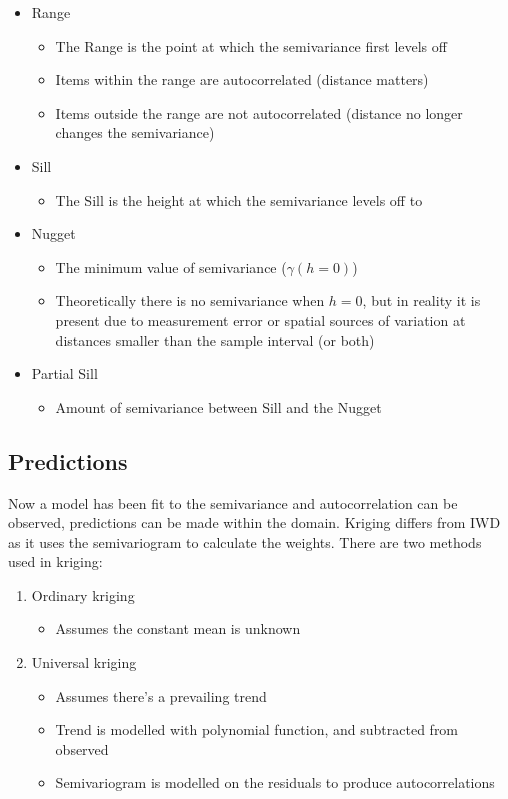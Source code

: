 \documentclass{article}
\begin{document}
\begin{itemize}
    \item Range
    \begin{itemize}
        \item The Range is the point at which the semivariance first levels off
        \item Items within the range are autocorrelated (distance matters)
        \item Items outside the range are not autocorrelated (distance no longer changes the semivariance)
    \end{itemize}
    \item Sill 
    \begin{itemize}
        \item The Sill is the height at which the semivariance levels off to
    \end{itemize}
    \item Nugget
    \begin{itemize}
        \item The minimum value of semivariance ($\gamma (h = 0)$)
        \item Theoretically there is no semivariance when $h=0$, but in reality it is present due to measurement error or spatial sources of variation at distances smaller than the sample interval (or both)
    \end{itemize}
    \item Partial Sill
    \begin{itemize}
        \item Amount of semivariance between Sill and the Nugget
    \end{itemize}
\end{itemize}

\subsection{Predictions}

Now a model has been fit to the semivariance and autocorrelation can be observed, predictions can be made within the domain.
Kriging differs from IWD as it uses the semivariogram to calculate the weights.
There are two methods used in kriging:

\begin{enumerate}
    \item Ordinary kriging
    \begin{itemize}
        \item Assumes the constant mean is unknown
    \end{itemize}
    \item Universal kriging
    \begin{itemize}
        \item Assumes there's a prevailing trend
        \item Trend is modelled with polynomial function, and subtracted from observed
        \item Semivariogram is modelled on the residuals to produce autocorrelations
    \end{itemize}
\end{enumerate}
\end{document}
